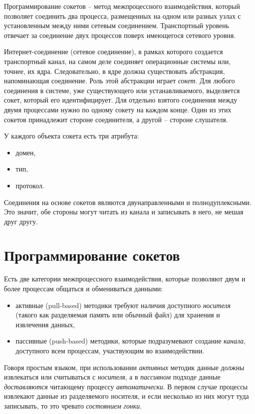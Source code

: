 \documentclass[%
	11pt,
	a4paper,
	utf8,
		]{article}
\begin{document}
Программирование сокетов -- метод межпроцессного взаимодействия, который позволяет соединить два процесса, размещенных на одном или разных узлах с установленным между ними сетевым соединением. Транспортный уровень отвечает за соединение двух процессов поверх имеющегося сетевого уровня.

Интернет-соединение (сетевое соединение), в рамках которого создается транспортный канал, на самом деле соединяет операционные системы или, точнее, их ядра. Следовательно, в ядре должна существовать абстракция, напоминающая соединение. Роль этой абстракции играет \emph{сокет}. Для любого соединения в системе, уже существующего или устанавливаемого, выделяется сокет, который его идентифицирует. Для отдельно взятого соединения между двумя процессами нужно по одному сокету на каждом конце. Один из этих сокетов принадлежит стороне соединителя, а другой -- стороне слушателя.

У каждого объекта сокета есть три атрибута:
\begin{itemize}
	\item домен,
	
	\item тип,
	
	\item протокол.
\end{itemize}

Соединения на основе сокетов являются двунаправленными и полнодуплексными. Это значит, обе стороны могут читать из канала и записывать в него, не мешая друг другу.

\section{Программирование сокетов}

Есть две категории межпроцессного взаимодействия, которые позволяют двум и более процессам общаться и обмениваться данными:
\begin{itemize}
	\item активные (pull-based) методики требуют наличия доступного \emph{носителя} (такого как разделяемая память или обычный файл) для хранения и извлечения данных,
	
	\item пассивные (push-based) методики, которые подразумевают создание \emph{канала}, доступного всем процессам, участвующим во взаимодействии.
\end{itemize}

Говоря простым языком, при использовании \emph{активных} методик данные должны извлекаться или считываться с \emph{носителя}, а в \emph{пассивном} подходе данные \emph{доставляются} читающему процессу \emph{автоматически}. В первом случае процессы извлекают данные из разделяемого носителя, и если несколько из них могут туда записывать, то это чревато \emph{состоянием гонки}.
\end{document}

